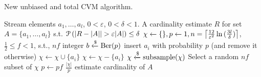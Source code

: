 \begin{algorithm}[h!]
	\caption{New unbiased and total CVM algorithm.}\label{alg:cvm_new}
	\begin{algorithmic}[1]
  \Require Stream elements $a_1,\dots,a_l$, $0 < \varepsilon$, $0 < \delta < 1$.
  \Ensure A cardinality estimate $R$ for set $A = \{ a_1,\dots,a_l \}$ s.t. $\prob \left( |R - |A| | > \varepsilon |A| \right) \leq \delta$
  \State $\chi \gets \{\}, p \gets 1, n = \ceil*{\frac{12}{\varepsilon^2} \ln{(\frac{3l}{\delta})} }$, $\frac{1}{2} \leq f < 1$, s.t., $nf$ integer
    \State $b \getsr \Ber(p)$ \Comment insert $a_i$ with probability $p$ (and remove it otherwise)
      \State $\chi \gets \chi \cup \{a_i\}$
    \Else
      \State $\chi \gets \chi - \{a_i\}$
    \EndIf
      \State $\chi \getsr \mathrm{subsample}(\chi)$ \Comment Select a random $nf$ subset of $\chi$
      \State $p \gets pf$
    \EndIf
  \EndFor
  \State \Return $\frac{|\chi|}{p}$ \Comment estimate cardinality of $A$
  \end{algorithmic}
\end{algorithm}

